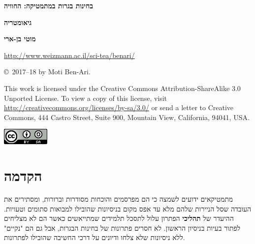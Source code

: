 
\thispagestyle{empty}

\begin{center}
\textbf{\LARGE בחינות בגרות במתמטיקה: החוויה}

\bigskip
\bigskip

\textbf{\LARGE גיאומטריה}

\bigskip
\bigskip
\bigskip
\bigskip

\textbf{\Large מוטי בן-ארי}

\bigskip
\bigskip

\url{http://www.weizmann.ac.il/sci-tea/benari/}
\end{center}

\vfill


\begin{footnotesize}
\begin{center}
\copyright{}\ 2017--18 by Moti Ben-Ari.
\end{center}

This work is licensed under the Creative Commons Attribution-ShareAlike 3.0 Unported License. To view a copy of this license, visit \url{http://creativecommons.org/licenses/by-sa/3.0/} or send a letter to Creative Commons, 444 Castro Street, Suite 900, Mountain View, California, 94041, USA.
\end{footnotesize}

\bigskip

\begin{center}
\includegraphics[width=.15\textwidth]{../../by-sa.png}
\end{center}

\np
\thispagestyle{empty}
\mbox{}
\np
\thispagestyle{empty}

\tableofcontents
\np
\thispagestyle{empty}
\mbox{}
\np

\section*{הקדמה}

מתמטיקאים ידועים לשמצה כי הם מפרסמים והוכחות מסודרות וברורות, ומסתירים את העובדה שסל הניירות שלהם מלא עד אפס מקום בניסיונות שהובילו למבואות סתומים וטעויות. ההיעדר של 
\textbf{תהליכי}
הפתרון עלול לתסכל תלמידים שמתייאשים כאשר הם לא מצליחים לפתור בעיות בניסיון הראשון. לא חסרים פתרונות של בחינות הבגרות, אבל גם הם "נקיים" ללא ניסיונות שלא צלחו ודיונים על דרכי החשיבה שהובילו לפתרונות.


